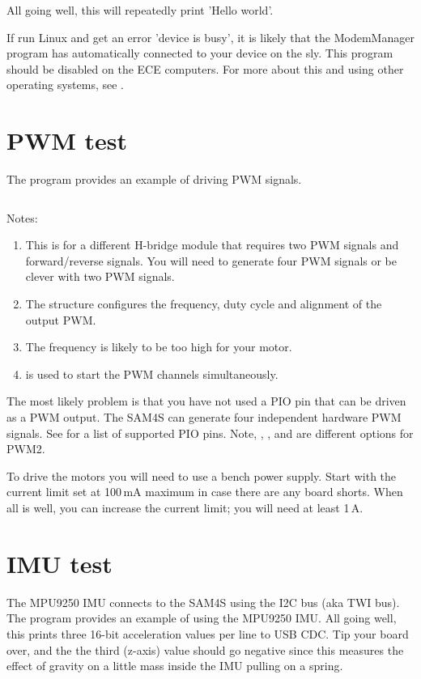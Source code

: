 All going well, this will repeatedly print 'Hello world'.

If run Linux and get an error 'device is busy', it is likely that the
ModemManager program has automatically connected to your device on the
sly. This program should be disabled on the ECE computers. For more
about this and using other operating systems, see .

\section{PWM test}
\label{pwm-test}

The program  provides an
example of driving PWM signals.

\inputminted{C}{../../src/test-apps/pwm_test2/pwm_test2.c}

Notes:
%
\begin{enumerate}
\item
  This is for a different H-bridge module that requires two PWM signals
  and forward/reverse signals. You will need to generate four PWM
  signals or be clever with two PWM signals.
\item
  The  structure configures the frequency, duty
  cycle and alignment of the output PWM.
\item The frequency is likely to be too high for your motor.
\item {} is used to start the PWM channels simultaneously.  
\end{enumerate}

The most likely problem is that you have not used a PIO pin that can
be driven as a PWM output. The SAM4S can generate four independent
hardware PWM signals. See  for a list of
supported PIO pins. Note, , , and  are
different options for PWM2.

To drive the motors you will need to use a bench power supply. Start
with the current limit set at 100\,mA maximum in case there are any
board shorts.  When all is well, you can increase the current limit;
you will need at least 1\,A.

\section{IMU test}
\label{imu-test}

The MPU9250 IMU connects to the SAM4S using the I2C bus (aka TWI bus).
The program  provides an
example of using the MPU9250 IMU.  All going well, this prints three
16-bit acceleration values per line to USB CDC. Tip your board over,
and the the third (z-axis) value should go negative since this
measures the effect of gravity on a little mass inside the IMU pulling
on a spring.

